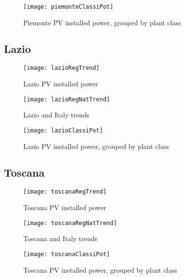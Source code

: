 \documentclass[12pt,a4paper,openright,twoside]{report}
\begin{document}
\begin{figure}[hp]
	\centering
	\texttt{[image: piemonteClassiPot]}
	\caption{Piemonte PV installed power, grouped by plant class}
	\label{piemonteClassiPot}
\end{figure}

\clearpage

\subsection*{Lazio}

\begin{figure}[hp]
	\centering
	\texttt{[image: lazioRegTrend]}
	\caption{Lazio PV installed power}
	\label{lazioRegTrend}
\end{figure}

\begin{figure}[hp]
	\centering
	\texttt{[image: lazioRegNatTrend]}
	\caption{Lazio and Italy trends}
	\label{lazioRegNatTrend}
\end{figure}

\clearpage

\begin{figure}[hp]
	\centering
	\texttt{[image: lazioClassiPot]}
	\caption{Lazio PV installed power, grouped by plant class}
	\label{lazioClassiPot}
\end{figure}



\subsection*{Toscana}

\begin{figure}[hp]
	\centering
	\texttt{[image: toscanaRegTrend]}
	\caption{Toscana PV installed power}
	\label{toscanaRegTrend}
\end{figure}

\begin{figure}[hp]
	\centering
	\texttt{[image: toscanaRegNatTrend]}
	\caption{Toscana and Italy trends}
	\label{toscanaRegNatTrend}
\end{figure}

\begin{figure}[hp]
	\centering
	\texttt{[image: toscanaClassiPot]}
	\caption{Toscana PV installed power, grouped by plant class}
	\label{toscanaClassiPot}
\end{figure}
\end{document}
